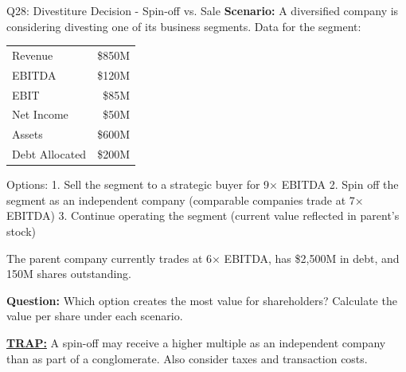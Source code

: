 \documentclass{beamer}
\renewcommand{\scriptsize}{\fontsize{6pt}{7pt}\selectfont}
\begin{document}
	\begin{frame}{Q28: Divestiture Decision - Spin-off vs. Sale}
		\scriptsize
		\textbf{Scenario:} A diversified company is considering divesting one of its business segments. Data for the segment:
		
		\begin{tabular}{lr}
			Revenue & \$850M \\
			EBITDA & \$120M \\
			EBIT & \$85M \\
			Net Income & \$50M \\
			Assets & \$600M \\
			Debt Allocated & \$200M \\
		\end{tabular}
		
		Options:
		1. Sell the segment to a strategic buyer for 9× EBITDA
		2. Spin off the segment as an independent company (comparable companies trade at 7× EBITDA)
		3. Continue operating the segment (current value reflected in parent's stock)
		
		The parent company currently trades at 6× EBITDA, has \$2,500M in debt, and 150M shares outstanding.
		
		\textbf{Question:} Which option creates the most value for shareholders? Calculate the value per share under each scenario.
		
		\vspace{2pt}
		\underline{\textbf{TRAP:}} A spin-off may receive a higher multiple as an independent company than as part of a conglomerate. Also consider taxes and transaction costs.
	\end{frame}
	
\end{document}
